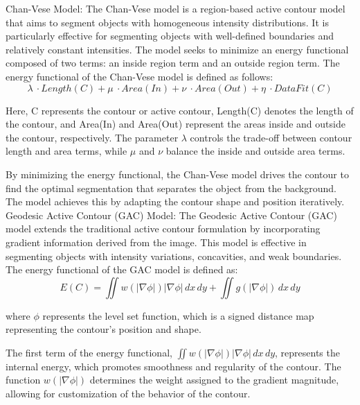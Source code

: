 \documentclass[]{report}
\begin{document}
Chan-Vese Model:
The Chan-Vese model is a region-based active contour model that aims to segment objects with homogeneous intensity distributions. It is particularly effective for segmenting objects with well-defined boundaries and relatively constant intensities. The model seeks to minimize an energy functional composed of two terms: an inside region term and an outside region term.
The energy functional of the Chan-Vese model is defined as follows:\\
\begin{equation}
    \lambda\ \cdot Length(C)+\mu\ \cdot Area(In)+ \nu\ \cdot Area(Out)+\eta\ \cdot DataFit(C)
\end{equation}

Here, C represents the contour or active contour, Length(C) denotes the length of the contour, and Area(In) and Area(Out) represent the areas inside and outside the contour, respectively. The parameter $\lambda$ controls the trade-off between contour length and area terms, while $\mu$ and $\nu$ balance the inside and outside area terms. 

By minimizing the energy functional, the Chan-Vese model drives the contour to find the optimal segmentation that separates the object from the background. The model achieves this by adapting the contour shape and position iteratively.\\

Geodesic Active Contour (GAC) Model:
The Geodesic Active Contour (GAC) model extends the traditional active contour formulation by incorporating gradient information derived from the image. This model is effective in segmenting objects with intensity variations, concavities, and weak boundaries.
The energy functional of the GAC model is defined as:\\


\begin{equation}
    E(C) = \iint w(\lvert \nabla\phi \rvert) \lvert \nabla\phi \rvert \, dx \, dy + \iint g(\lvert \nabla\phi \rvert) \, dx \, dy
\end{equation}

where $\phi$ represents the level set function, which is a signed distance map representing the contour's position and shape. 

The first term of the energy functional, $\iint w(\lvert \nabla\phi \rvert) \lvert \nabla\phi \rvert \, dx \, dy$, represents the internal energy, which promotes smoothness and regularity of the contour. The function $w(\lvert \nabla\phi \rvert)$ determines the weight assigned to the gradient magnitude, allowing for customization of the behavior of the contour.
\end{document}
